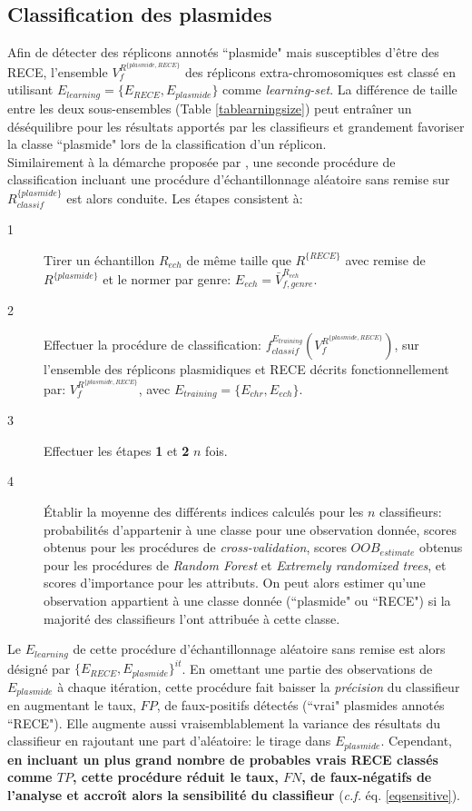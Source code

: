 \subsection{Classification des plasmides}
	Afin de détecter des réplicons annotés ``plasmide" mais susceptibles d'être des RECE, l'ensemble $V_{f}^{R^{\{plasmide,RECE\}}}$ des réplicons extra-chromosomiques est classé en utilisant $E_{learning}=\{E_{RECE},E_{plasmide}\}$ comme \textit{learning-set}. La différence de taille entre les deux sous-ensembles (Table \ref{tablearningsize}) peut entraîner un déséquilibre pour les résultats apportés par les classifieurs \citep[p.385]{han2012data} et grandement favoriser la classe ``plasmide" lors de la classification d'un réplicon.\\
	Similairement à la démarche proposée par \cite[p.213]{Larose2006}, une seconde procédure de classification incluant une procédure d'échantillonnage aléatoire sans remise sur $R^{\{plasmide\}}_{classif}$ est alors conduite. Les étapes consistent à:
\begin{description}
	\item[1] Tirer un échantillon $R_{ech}$ de même taille que $R^{\{RECE\}}$ avec remise de $R^{\{plasmide\}}$ et le normer par genre: $E_{ech}=\bar{V}_{f,genre}^{R_{ech}}$.
	\item[2] Effectuer la procédure de classification: $f_{classif}^{E_{training}}(V_{f}^{R^{\{plasmide,RECE\}}})$, sur l'ensemble des réplicons plasmidiques et RECE décrits fonctionnellement par: $V_{f}^{R^{\{plasmide,RECE\}}}$, avec $E_{training}=\{E_{chr},E_{ech}\}$.
	\item[3] Effectuer les étapes \textbf{1} et \textbf{2} $n$ fois.
	\item[4] Établir la moyenne des différents indices calculés pour les $n$ classifieurs: probabilités d'appartenir à une classe pour une observation donnée, scores obtenus pour les procédures de \textit{cross-validation}, scores $OOB_{estimate}$ obtenus pour les procédures de \textit{Random Forest} et \textit{Extremely randomized trees}, et scores d'importance pour les attributs. On peut alors estimer qu'une observation appartient à une classe donnée (``plasmide" ou ``RECE") si la majorité des classifieurs l'ont attribuée à cette classe.
	\end{description}
	Le $E_{learning}$ de cette procédure d'échantillonnage aléatoire sans remise est alors désigné par $\{E_{RECE},E_{plasmide}\}^{it}$. En omettant une partie des observations de $E_{plasmide}$ à chaque itération, cette procédure fait baisser la \textit{précision} du classifieur en augmentant le taux, $FP$, de faux-positifs détectés (``vrai" plasmides annotés ``RECE"). Elle augmente aussi vraisemblablement la variance des résultats du classifieur en rajoutant une part d'aléatoire: le tirage dans $E_{plasmide}$. Cependant, \textbf{en incluant un plus grand nombre de probables vrais RECE classés comme $TP$, cette procédure réduit le taux, $FN$, de faux-négatifs de l'analyse et accroît alors la sensibilité du classifieur} (\textit{c.f.} éq. \ref{eqsensitive}).

